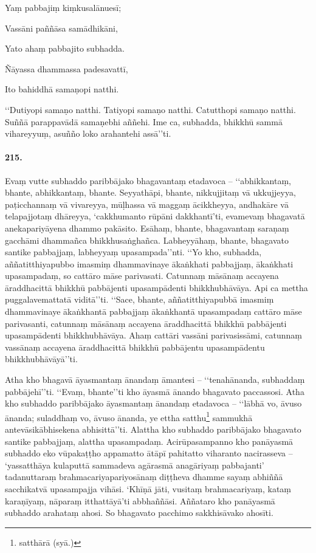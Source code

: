 Yaṃ pabbajiṃ kiṃkusalānuesī;

Vassāni paññāsa samādhikāni,

Yato ahaṃ pabbajito subhadda.

Ñāyassa dhammassa padesavattī,

Ito bahiddhā samaṇopi natthi.

‘‘Dutiyopi samaṇo natthi. Tatiyopi samaṇo natthi. Catutthopi samaṇo natthi. Suññā parappavādā samaṇebhi aññehi. Ime ca, subhadda, bhikkhū sammā vihareyyuṃ, asuñño loko arahantehi assā’’ti.

\paragraph{215.} Evaṃ vutte subhaddo paribbājako bhagavantaṃ etadavoca – ‘‘abhikkantaṃ, bhante, abhikkantaṃ, bhante. Seyyathāpi, bhante, nikkujjitaṃ vā ukkujjeyya, paṭicchannaṃ vā vivareyya, mūḷhassa vā maggaṃ ācikkheyya, andhakāre vā telapajjotaṃ dhāreyya, ‘cakkhumanto rūpāni dakkhantī’ti, evamevaṃ bhagavatā anekapariyāyena dhammo pakāsito. Esāhaṃ, bhante, bhagavantaṃ saraṇaṃ gacchāmi dhammañca bhikkhusaṅghañca. Labheyyāhaṃ, bhante, bhagavato santike pabbajjaṃ, labheyyaṃ upasampada’’nti. ‘‘Yo kho, subhadda, aññatitthiyapubbo imasmiṃ dhammavinaye ākaṅkhati pabbajjaṃ, ākaṅkhati upasampadaṃ, so cattāro māse parivasati. Catunnaṃ māsānaṃ accayena āraddhacittā bhikkhū pabbājenti upasampādenti bhikkhubhāvāya. Api ca mettha puggalavemattatā viditā’’ti. ‘‘Sace, bhante, aññatitthiyapubbā imasmiṃ dhammavinaye ākaṅkhantā pabbajjaṃ ākaṅkhantā upasampadaṃ cattāro māse parivasanti, catunnaṃ māsānaṃ accayena āraddhacittā bhikkhū pabbājenti upasampādenti bhikkhubhāvāya. Ahaṃ cattāri vassāni parivasissāmi, catunnaṃ vassānaṃ accayena āraddhacittā bhikkhū pabbājentu upasampādentu bhikkhubhāvāyā’’ti.

Atha kho bhagavā āyasmantaṃ ānandaṃ āmantesi – ‘‘tenahānanda, subhaddaṃ pabbājehī’’ti. ‘‘Evaṃ, bhante’’ti kho āyasmā ānando bhagavato paccassosi. Atha kho subhaddo paribbājako āyasmantaṃ ānandaṃ etadavoca – ‘‘lābhā vo, āvuso ānanda; suladdhaṃ vo, āvuso ānanda, ye ettha satthu\footnote{satthārā (syā.)} sammukhā antevāsikābhisekena abhisittā’’ti. Alattha kho subhaddo paribbājako bhagavato santike pabbajjaṃ, alattha upasampadaṃ. Acirūpasampanno kho panāyasmā subhaddo eko vūpakaṭṭho appamatto ātāpī pahitatto viharanto nacirasseva – ‘yassatthāya kulaputtā sammadeva agārasmā anagāriyaṃ pabbajanti’ tadanuttaraṃ brahmacariyapariyosānaṃ diṭṭheva dhamme sayaṃ abhiññā sacchikatvā upasampajja vihāsi. ‘Khīṇā jāti, vusitaṃ brahmacariyaṃ, kataṃ karaṇīyaṃ, nāparaṃ itthattāyā’ti abbhaññāsi. Aññataro kho panāyasmā subhaddo arahataṃ ahosi. So bhagavato pacchimo sakkhisāvako ahosīti.

